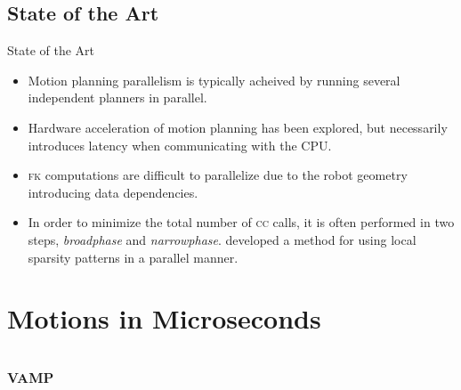 \documentclass{beamer}
\begin{document}
\subsection{State of the Art}

\begin{frame}{State of the Art}
\begin{itemize}
\item Motion planning parallelism is typically acheived by running several independent planners in parallel. %
\item Hardware acceleration of motion planning has been explored, but necessarily introduces latency when communicating with the CPU.
\item \textsc{fk} computations are difficult to parallelize due to the robot geometry introducing data dependencies.
\item In order to minimize the total number of \textsc{cc} calls, it is often performed in two steps, \textit{broadphase} and \textit{narrowphase}. \cite{paper:eemp} developed a method for using local sparsity patterns in a parallel manner.
\end{itemize}
\end{frame}

\section{Motions in Microseconds}

\subsection{\textsc{vamp}}


%
%
\end{document}

